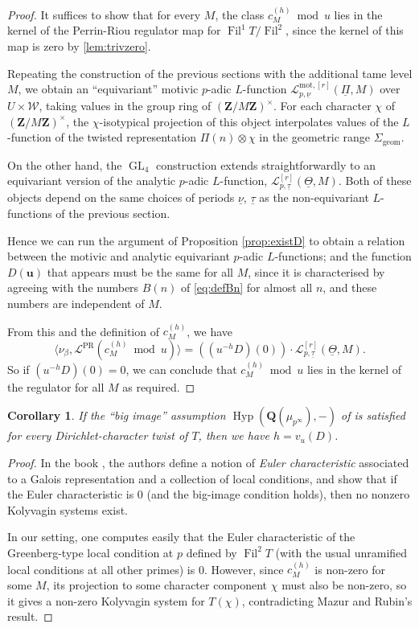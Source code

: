 \documentclass[cjm]{ipart}
\theoremstyle{plain}
\newtheorem{corollary}[theorem]{Corollary}
\theoremstyle{remark}
\DeclareMathOperator{\Fil}{Fil}
\DeclareMathOperator{\GL}{GL}
\newcommand{\QQ}{\mathbf{Q}}
\newcommand{\ZZ}{\mathbf{Z}}
\newcommand{\cL}{\mathcal{L}}
\newcommand{\cW}{\mathcal{W}}
\newcommand{\uPi}{\underline{\Pi}}
\newcommand{\uTh}{\underline{\Theta}}
\newcommand{\unu}{\underline{\nu}}
\newcommand{\utau}{\underline{\tau}}
\numberwithin{equation}{subsection}
\begin{document}
  \begin{proof}
   It suffices to show that for every $M$, the class $c_M^{(h)} \bmod u$ lies in the kernel of the Perrin-Riou regulator map for $\Fil^1 T / \Fil^2$, since the kernel of this map is zero by \cref{lem:trivzero}.

   Repeating the construction of the previous sections with the additional tame level $M$, we obtain an ``equivariant'' motivic $p$-adic $L$-function $\cL^{\mathrm{mot}, [r]}_{p, \unu}(\uPi, M)$ over $U \times \cW$, taking values in the group ring of $(\ZZ / M\ZZ)^\times$. For each character $\chi$ of $(\ZZ / M\ZZ)^\times$, the $\chi$-isotypical projection of this object interpolates values of the $L$-function of the twisted representation $\Pi(n) \otimes \chi$ in the geometric range $\Sigma_{\mathrm{geom}}$.

   On the other hand, the $\GL_4$ construction extends straightforwardly to an equivariant version of the analytic $p$-adic $L$-function, $\cL^{[r]}_{p, \utau}(\uTh, M)$. Both of these objects depend on the same choices of periods $\unu$, $\utau$ as the non-equivariant $L$-functions of the previous section.

   Hence we can run the argument of Proposition \ref{prop:existD} to obtain a relation between the motivic and analytic equivariant $p$-adic $L$-functions; and the function $D(\mathbf{u})$ that appears must be the same for all $M$, since it is characterised by agreeing with the numbers $B(n)$ of \eqref{eq:defBn} for almost all $n$, and these numbers are independent of $M$.

   From this and the definition of $c_M^{(h)}$, we have
   \[
    \langle \nu_\beta, \cL^{\mathrm{PR}}(c_M^{(h)} \bmod u)\rangle = \left( (u^{-h} D)(0)\right)\cdot \cL^{[r]}_{p, \utau}(\uTh, M).
   \]
   So if $(u^{-h} D)(0) = 0$, we can conclude that $c_M^{(h)} \bmod u$ lies in the kernel of the regulator for all $M$ as required.
  \end{proof}

  \begin{corollary}
   If the ``big image'' assumption $\operatorname{Hyp}(\QQ(\mu_{p^\infty}), -)$ of \cite{rubin00} is satisfied for every Dirichlet-character twist of $T$, then we have $h = v_u(D)$.
  \end{corollary}

  \begin{proof}
   In the book \cite{mazurrubin04}, the authors define a notion of \emph{Euler characteristic} associated to a Galois representation and a collection of local conditions, and show that if the Euler characteristic is 0 (and the big-image condition holds), then no nonzero Kolyvagin systems exist.

   In our setting, one computes easily that the Euler characteristic of the Greenberg-type local condition at $p$ defined by $\Fil^2 T$ (with the usual unramified local conditions at all other primes) is 0. However, since $c_M^{(h)}$ is non-zero for some $M$, its projection to some character component $\chi$ must also be non-zero, so it gives a non-zero Kolyvagin system for $T(\chi)$, contradicting Mazur and Rubin's result.
  \end{proof}
\end{document}
